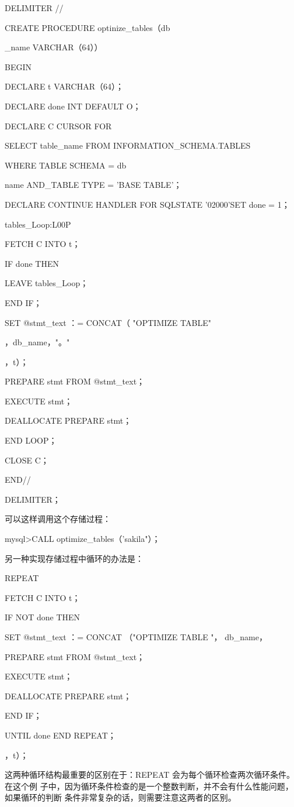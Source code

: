 DELIMITER //

CREATE PROCEDURE optinize\_tables（db

\_name VARCHAR（64））

BEGIN

DECLARE t VARCHAR（64）；

DECLARE done INT DEFAULT O；

DECLARE C CURSOR FOR

SELECT table\_name FROM INFORMATION\_SCHEMA.TABLES

WHERE TABLE SCHEMA = db

name AND\_TABLE TYPE = 'BASE TABLE'；

DECLARE CONTINUE HANDLER FOR SQLSTATE '02000'SET done = 1；

tables\_Loop:L00P

FETCH C INTO t；

IF done THEN

LEAVE tables\_Loop；

END IF；

SET @stmt\_text ：= CONCAT（ "OPTIMIZE TABLE"

，db\_name，"。"

，t）；

PREPARE stmt FROM @stmt\_text；

EXECUTE stmt；

DEALLOCATE PREPARE stmt；

END LOOP；

CLOSE C；

END//

DELIMITER；

可以这样调用这个存储过程：

mysql>CALL optimize\_tables（'sakila"）；

另一种实现存储过程中循环的办法是：

REPEAT

FETCH C INTO t；

IF NOT done THEN

SET @stmt\_text ：= CONCAT （"OPTIMIZE TABLE "， db\_name，

PREPARE stmt FROM @stmt\_text；

EXECUTE stmt；

DEALLOCATE PREPARE stmt；

END IF；

UNTIL done END REPEAT；

，t）；

这两种循环结构最重要的区别在于：REPEAT 会为每个循环检查两次循环条件。在这个例
子中，因为循环条件检查的是一个整数判断，并不会有什么性能问题，如果循环的判断
条件非常复杂的话，则需要注意这两者的区别。

